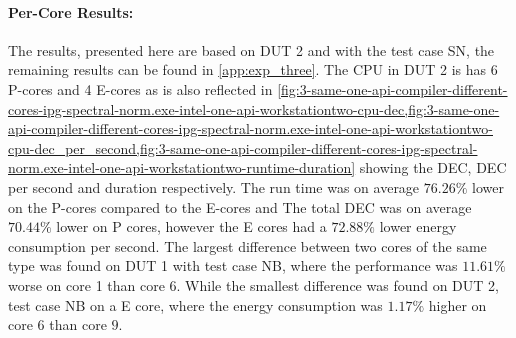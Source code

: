 \paragraph{Per-Core Results:} The results, presented here are based on DUT 2 and with the test case SN, the remaining results can be found in \cref{app:exp_three}. The CPU in DUT 2 is has 6 P-cores and 4 E-cores as is also reflected in \cref{fig:3-same-one-api-compiler-different-cores-ipg-spectral-norm.exe-intel-one-api-workstationtwo-cpu-dec,fig:3-same-one-api-compiler-different-cores-ipg-spectral-norm.exe-intel-one-api-workstationtwo-cpu-dec_per_second,fig:3-same-one-api-compiler-different-cores-ipg-spectral-norm.exe-intel-one-api-workstationtwo-runtime-duration} showing the DEC, DEC per second and duration respectively. The run time was on average $76.26\%$ lower on the P-cores compared to the E-cores and The total DEC was on average $70.44\%$ lower on P cores, however the E cores had a $72.88\%$ lower energy consumption per second. %
The largest difference between two cores of the same type was found on DUT 1 with test case NB, where the performance was $11.61\%$ worse on core 1 than core 6. While the smallest difference was found on DUT 2, test case NB on a E core, where the energy consumption was $1.17\%$ higher on core $6$ than core $9$.







